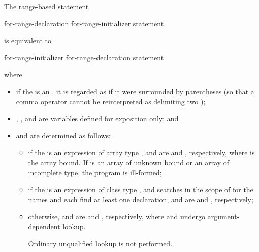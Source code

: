 \pnum
The range-based  statement
\begin{ncsimplebnf}
 \terminal{(}  for-range-declaration \terminal{:} for-range-initializer \terminal{)} statement
\end{ncsimplebnf}
is equivalent to
\begin{ncsimplebnf}
\terminal{\{}\br
\bnfindent {}\br
\bnfindent {} \terminal{\&\&} \terminal{=} for-range-initializer \terminal{;}\br
\bnfindent {}  \terminal{=}  \terminal{;}\br
\bnfindent {}  \terminal{=}  \terminal{;}\br
\bnfindent {} \terminal{(} \terminal{;}  \terminal{!=} \terminal{;} \terminal{++} \terminal{)} \terminal{\{}\br
\bnfindent\bnfindent for-range-declaration \terminal{=} \terminal{*}  \terminal{;}\br
\bnfindent\bnfindent statement\br
\bnfindent \terminal{\}}\br
\terminal{\}}
\end{ncsimplebnf}
where
\begin{itemize}
\item
if the  is an ,
it is regarded as if it were surrounded by parentheses (so that a comma operator
cannot be reinterpreted as delimiting two );

\item {}, , and  are variables defined for
exposition only; and

\item
{} and  are determined as follows:

\begin{itemize}
\item if the  is an expression of
array type ,  and  are
 and  \tcode{+} , respectively,
where  is
the array bound. If  is an array of unknown bound or an array of
incomplete type, the program is ill-formed;

\item if the  is
an expression of class type , and
searches in the scope of 
for the names  and 
each find at least one declaration,
 and  are
 and ,
respectively;

\item otherwise,  and  are
 and , respectively,
where  and  undergo
argument-dependent lookup.
\begin{note}
Ordinary unqualified lookup is not
performed.
\end{note}
\end{itemize}
\end{itemize}

